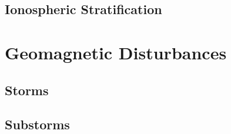 \subsection{Ionospheric Stratification}

\section{Geomagnetic Disturbances}

\subsection{Storms}

\subsection{Substorms}







